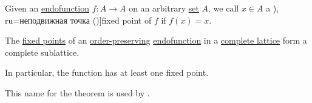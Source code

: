 \begin{definition}\label{def:fixed_point}
  Given an \hyperref[def:function/endofunction]{endofunction} \( f: A \to A \) on an arbitrary \hyperref[def:set]{set} \( A \), we call \( x \in A \) a \term[bg=неподвижна точка (\cite[138]{Боянов2008}), ru=неподвижная точка (\cite[23]{Зорич2019Том1})]{fixed point} of \( f \) if \( f(x) = x \).
\end{definition}

\begin{theorem}\label{thm:knaster_tarski_theorem}
  The \hyperref[def:fixed_point]{fixed points} of an \hyperref[def:order_function]{order-preserving} \hyperref[def:function/endofunction]{endofunction} in a \hyperref[def:complete_lattice]{complete lattice} form a complete sublattice.
\end{theorem}
\begin{comments}
  \item In particular, the function has at least one fixed point.
  \item This name for the theorem is used by .
\end{comments}
